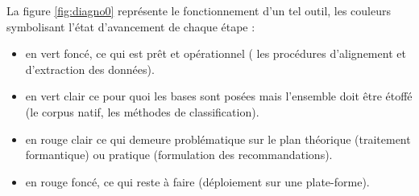 \documentclass[
  10pt,
]{article}
\begin{document}
La figure \ref{fig:diagno0} représente le fonctionnement d'un tel outil, les couleurs
symbolisant l'état d'avancement de chaque étape :

\begin{itemize}
\item
  en vert foncé, ce qui est prêt et opérationnel ( les procédures d'alignement et d'extraction des données).
\item
  en vert clair ce pour quoi les bases sont posées mais l'ensemble doit être étoffé (le corpus natif, les méthodes de classification).
\item
  en rouge clair ce qui demeure problématique sur le plan théorique (traitement formantique) ou pratique (formulation des recommandations).
\item
  en rouge foncé, ce qui reste à faire (déploiement sur une plate-forme).
\end{itemize}
\end{document}
